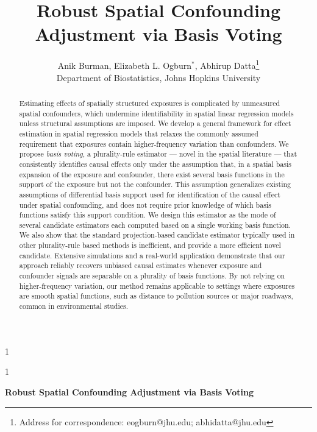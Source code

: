 \documentclass[
  12pt]{article}
\newcommand{\anon}{1}
\begin{document}
\def\spacingset#1{\renewcommand{\baselinestretch}%
{#1}\small\normalsize} \spacingset{1}




\anon
{
  \title{\bf 
  Robust Spatial Confounding Adjustment via Basis Voting} 
  \author{Anik Burman, Elizabeth L. Ogburn$^{\ast}$, Abhirup Datta\thanks{
   Address for correspondence: eogburn@jhu.edu; abhidatta@jhu.edu
    }\hspace{.2cm}\\
    Department of Biostatistics, Johns Hopkins University\\}
    \date{}
  \maketitle
} \fi

\anon
{
  \bigskip
  \bigskip
  \bigskip
  \begin{center}
    {\LARGE\bf Robust Spatial Confounding Adjustment via Basis Voting}
\end{center}
  \medskip
} \fi

\bigskip
\begin{abstract}
Estimating effects of spatially structured exposures is complicated by unmeasured spatial confounders, which undermine identifiability in spatial linear regression models unless structural assumptions are imposed. We develop a general framework for  effect estimation in spatial regression models that relaxes the commonly assumed requirement that exposures contain higher-frequency variation than confounders. We propose \textit{basis voting}, a plurality-rule estimator --- novel in the spatial literature --- that consistently identifies causal effects only under the assumption that, in a spatial basis expansion of the exposure and confounder, there exist several basis functions in the support of the exposure but not the confounder. This assumption generalizes existing assumptions of differential basis support used for identification of the causal effect under spatial confounding, and does not require prior knowledge of which basis functions satisfy this support condition. We design this estimator as the mode of several candidate estimators each computed based on a single working basis function. We also show that the standard projection-based candidate estimator typically used in other plurality-rule based methods is inefficient, and provide a more efficient novel candidate. Extensive simulations and a real-world application demonstrate that our approach reliably recovers unbiased causal estimates whenever exposure and confounder signals are separable on a plurality of basis functions. By not relying on higher-frequency variation, our method remains applicable to settings where exposures are smooth spatial functions, such as distance to pollution sources or major roadways, common in environmental studies.
\end{abstract}
\end{document}
